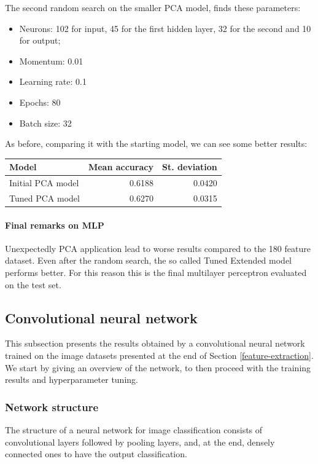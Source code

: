 The second random search on the smaller PCA model, finds these parameters:
\begin{itemize}
    \item Neurons: 102 for input, 45 for the first hidden layer, 32 for the second and 10 for output;
    \item Momentum: 0.01
    \item Learning rate: 0.1
    \item Epochs: 80
    \item Batch size: 32
\end{itemize}
As before, comparing it with the starting model, we can see some better results:
\begin{center}
    \begin{tabular}{ |l|r|r| } 
        \hline
        Model & Mean accuracy & St. deviation \\
        \hline
        Initial PCA model & 0.6188 & 0.0420\\
        Tuned PCA model & 0.6270 & 0.0315\\
        \hline
    \end{tabular}
\end{center}

\paragraph{Final remarks on MLP}
Unexpectedly PCA application lead to worse results compared to the 180
feature dataset. Even after the random search, the so called Tuned Extended model
performs better. For this reason this is the final multilayer perceptron
evaluated on the test set.

\subsection{Convolutional neural network}
This subsection presents the results obtained by a convolutional
neural network trained on the image datasets presented at the end of 
Section \vref*{feature-extraction}.
We start by giving an overview of the network, to then proceed 
with the training results and hyperparameter tuning.

\subsubsection{Network structure}
The structure of a neural network for image classification 
consists of convolutional layers followed by pooling layers, 
and, at the end, densely connected ones to have the output classification.

